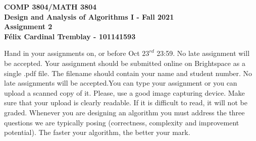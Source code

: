 \documentclass[12pt]{article}
\newcounter{ques}
\begin{document}
\begin{center} \large\bf
COMP 3804/MATH 3804\\
Design and Analysis of Algorithms I  -
Fall  2021\\
Assignment 2\\
Félix Cardinal Tremblay - 101141593
\end{center}

Hand in your assignments on, or before
Oct $23^{rd}$ 23:59. No late assignment will be accepted. Your assignment should be submitted online on Brightspace as a single .pdf file.  The filename should contain your name and student number. No late assignments will be accepted.You can type your assignment or you can upload a scanned copy of it.  Please, use a good image capturing device. Make sure that your upload is clearly readable. If it is difficult to read, it will not be graded. Whenever you are designing an algorithm you must address the three questions we are
typically posing (correctness, complexity and improvement potential).
The faster your
algorithm, the better your mark.     \\

\vspace{1em}
\end{document}
